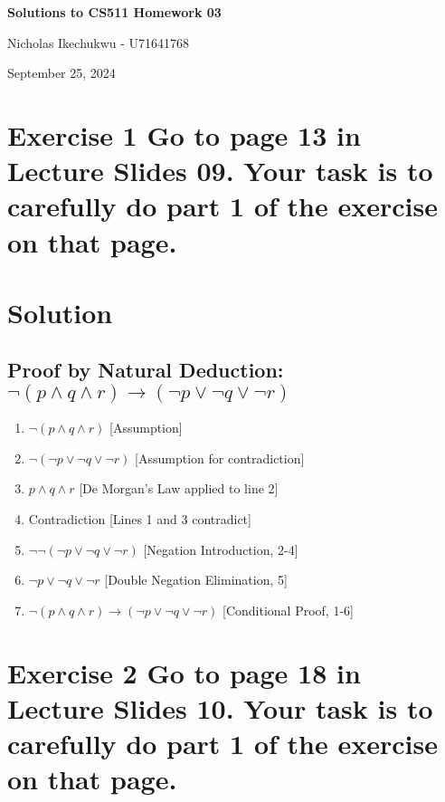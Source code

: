 \documentclass{article}
\begin{document}
\begin{center}
    \Large\textbf{Solutions to CS511 Homework 03}
    
    \vspace{0.5cm}
    
    \large Nicholas Ikechukwu - U71641768
    
    \vspace{0.3cm}
    
    \large September 25, 2024
\end{center}



\section*{Exercise 1 Go to page 13 in Lecture Slides 09. Your task is to carefully do part 1 of the exercise
on that page.}

\section*{Solution}
\subsection*{Proof by Natural Deduction: $\neg(p \wedge q \wedge r)\rightarrow (\neg p \vee \neg q \vee \neg r)$}
\begin{enumerate}
    \item $\neg(p \wedge q \wedge r)$  \hfill [Assumption]
    \item $\neg(\neg p \vee \neg q \vee \neg r)$  \hfill [Assumption for contradiction]
    \item $p \wedge q \wedge r$  \hfill [De Morgan's Law applied to line 2]
    \item Contradiction  \hfill [Lines 1 and 3 contradict]
    \item $\neg\neg(\neg p \vee \neg q \vee \neg r)$  \hfill [Negation Introduction, 2-4]
    \item $\neg p \vee \neg q \vee \neg r$  \hfill [Double Negation Elimination, 5]
    \item $\neg(p \wedge q \wedge r) \to (\neg p \vee \neg q \vee \neg r)$  \hfill [Conditional Proof, 1-6]
\end{enumerate}

\newpage

\section*{Exercise 2 Go to page 18 in Lecture Slides 10. Your task is to carefully do part 1 of the exercise
on that page. }
\end{document}
